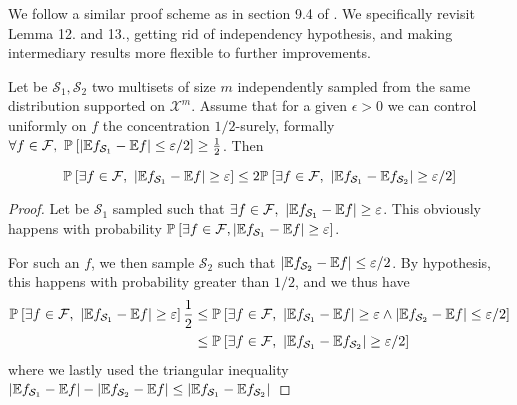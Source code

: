We follow a similar proof scheme as in section 9.4 of \cite{haussler1992decisiontheoricgeneralizationofPACmodel}. We specifically revisit Lemma 12. and 13., getting rid of independency hypothesis, and making intermediary results more flexible to further improvements.

\begin{lemma}
	Let be $\mathcal{S}_1, \mathcal{S}_2$ two multisets of size $m$ independently sampled from the same distribution supported on $\mathcal{X}^m$. Assume that for a given $\epsilon>0$ we can control uniformly on $f$ the concentration $1/2$-surely, formally $\forall f \in \mathcal{F},\ \mathbb{P}_{}\left[ \lvert \mathbb{E} {f_{\mathcal{S}_1}} - \mathbb{E} f \rvert \leq \varepsilon/2\right] \geq \frac 1 2$. Then

   \begin{equation}
	   \PPP{}{ \exists f \in \mathcal{F},\ \lvert \EE{f_{\mathcal{S}_1}} - \EE f \rvert \geq \epsilon} \leq 2\PPP{}{\exists f \in \mathcal{F},\ \lvert \EE{f_{\mathcal{S}_1}} - \EE{f_{\mathcal{S}_2}} \rvert \geq \epsilon/2 }
   \end{equation}
\end{lemma}

\begin{proof}
	Let be $\mathcal{S}_1$ sampled such that $\exists f \in \mathcal{F},\ |\EE {f_{\mathcal{S}_1}} - \EE f| \geq \epsilon$. This obviously happens with probability $\mathbb{P}_{}\left[\exists f \in \mathcal{F}, |\mathbb{E}{f_{\mathcal{S}_1}} - \mathbb{E} f| \geq \varepsilon \right]$.

	For such an $f$, we then sample $\mathcal{S}_2$ such that $|\mathbb{E} {f_{\mathcal{S}_2}} -  \mathbb{E} f| \leq \varepsilon/2$. By hypothesis, this happens with probability greater than $1/2$, and we thus have
	\begin{align*}
		\mathbb{P}_{}\left[ \exists f \in \mathcal{F},\ \lvert \mathbb{E}{f_{\mathcal{S}_1}} - \mathbb{E} f \rvert \geq \varepsilon\right]
		\frac 1 2 
		&\leq \mathbb{P}_{}\left[\exists f \in \mathcal{F},\ \lvert \mathbb{E}{f_{\mathcal{S}_1}} - \mathbb{E} f \rvert \geq \varepsilon \wedge \lvert\mathbb{E}{f_{\mathcal{S}_2}} - \mathbb{E} f \rvert \leq \varepsilon/2 \right] \\
		&\leq \mathbb{P}_{}\left[\exists f \in \mathcal{F},\ \lvert \mathbb{E}{f_{\mathcal{S}_1}} - \mathbb{E}{f_{\mathcal{S}_2}} \rvert \geq \varepsilon/2 \right]
	\end{align*}
	where we lastly used the triangular inequality $ \lvert \mathbb{E}{f_{\mathcal{S}_1}} - \mathbb{E} f \rvert - \lvert\mathbb{E}{f_{\mathcal{S}_2}} - \mathbb{E} f \rvert \leq   \lvert \mathbb{E}{f_{\mathcal{S}_1}} - \mathbb{E}{f_{\mathcal{S}_2}} \rvert  $
\end{proof}



